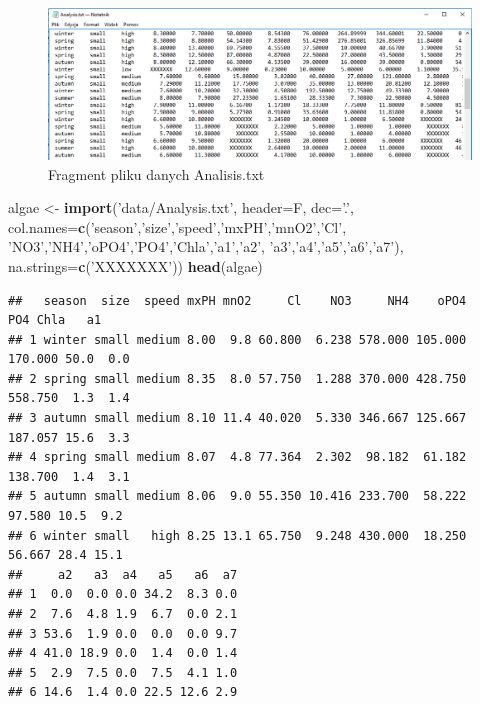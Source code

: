 \documentclass[
]{book}
\newenvironment{Shaded}{\begin{snugshade}}{\end{snugshade}}
\newcommand{\DataTypeTok}[1]{\textcolor[rgb]{0.13,0.29,0.53}{#1}}
\newcommand{\KeywordTok}[1]{\textcolor[rgb]{0.13,0.29,0.53}{\textbf{#1}}}
\newcommand{\NormalTok}[1]{#1}
\newcommand{\StringTok}[1]{\textcolor[rgb]{0.31,0.60,0.02}{#1}}
\theoremstyle{plain}
\theoremstyle{definition}
\theoremstyle{definition}
\theoremstyle{definition}
\theoremstyle{definition}
\theoremstyle{remark}
\begin{document}
\begin{figure}
\includegraphics[width=10.67in]{images/analalysi_foto} \caption{Fragment pliku danych Analisis.txt}\label{fig:foto}
\end{figure}

\begin{Shaded}
\begin{Highlighting}[]
\NormalTok{algae <-}\StringTok{ }\KeywordTok{import}\NormalTok{(}\StringTok{'data/Analysis.txt'}\NormalTok{, }\DataTypeTok{header=}\NormalTok{F, }
                \DataTypeTok{dec=}\StringTok{'.'}\NormalTok{, }
                \DataTypeTok{col.names=}\KeywordTok{c}\NormalTok{(}\StringTok{'season'}\NormalTok{,}\StringTok{'size'}\NormalTok{,}\StringTok{'speed'}\NormalTok{,}\StringTok{'mxPH'}\NormalTok{,}\StringTok{'mnO2'}\NormalTok{,}\StringTok{'Cl'}\NormalTok{,}
                            \StringTok{'NO3'}\NormalTok{,}\StringTok{'NH4'}\NormalTok{,}\StringTok{'oPO4'}\NormalTok{,}\StringTok{'PO4'}\NormalTok{,}\StringTok{'Chla'}\NormalTok{,}\StringTok{'a1'}\NormalTok{,}\StringTok{'a2'}\NormalTok{,}
                            \StringTok{'a3'}\NormalTok{,}\StringTok{'a4'}\NormalTok{,}\StringTok{'a5'}\NormalTok{,}\StringTok{'a6'}\NormalTok{,}\StringTok{'a7'}\NormalTok{),}
                \DataTypeTok{na.strings=}\KeywordTok{c}\NormalTok{(}\StringTok{'XXXXXXX'}\NormalTok{))}
\KeywordTok{head}\NormalTok{(algae)}
\end{Highlighting}
\end{Shaded}

\begin{verbatim}
##   season  size  speed mxPH mnO2     Cl    NO3     NH4    oPO4     PO4 Chla   a1
## 1 winter small medium 8.00  9.8 60.800  6.238 578.000 105.000 170.000 50.0  0.0
## 2 spring small medium 8.35  8.0 57.750  1.288 370.000 428.750 558.750  1.3  1.4
## 3 autumn small medium 8.10 11.4 40.020  5.330 346.667 125.667 187.057 15.6  3.3
## 4 spring small medium 8.07  4.8 77.364  2.302  98.182  61.182 138.700  1.4  3.1
## 5 autumn small medium 8.06  9.0 55.350 10.416 233.700  58.222  97.580 10.5  9.2
## 6 winter small   high 8.25 13.1 65.750  9.248 430.000  18.250  56.667 28.4 15.1
##     a2   a3  a4   a5   a6  a7
## 1  0.0  0.0 0.0 34.2  8.3 0.0
## 2  7.6  4.8 1.9  6.7  0.0 2.1
## 3 53.6  1.9 0.0  0.0  0.0 9.7
## 4 41.0 18.9 0.0  1.4  0.0 1.4
## 5  2.9  7.5 0.0  7.5  4.1 1.0
## 6 14.6  1.4 0.0 22.5 12.6 2.9
\end{verbatim}
\end{document}
